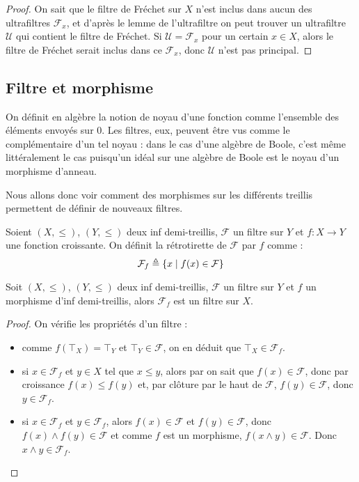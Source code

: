 \begin{proof}
  On sait que le filtre de Fréchet sur $X$ n'est inclus dans aucun des
  ultrafiltres $\mathcal F_x$, et d'après le lemme de l'ultrafiltre on peut
  trouver un ultrafiltre $\mathcal U$ qui contient le filtre de Fréchet. Si
  $\mathcal U = \mathcal F_x$ pour un certain $x\in X$, alors le filtre de
  Fréchet serait inclus dans ce $\mathcal F_x$, donc $\mathcal U$ n'est pas
  principal.
\end{proof}

\subsection{Filtre et morphisme}

On définit en algèbre la notion de noyau d'une fonction comme l'ensemble des
éléments envoyés sur $0$. Les filtres, eux, peuvent être vus comme le
complémentaire d'un tel noyau : dans le cas d'une algèbre de Boole, c'est même
littéralement le cas puisqu'un idéal sur une algèbre de Boole est le noyau d'un
morphisme d'anneau.

Nous allons donc voir comment des morphismes sur les différents treillis
permettent de définir de nouveaux filtres.

\begin{definition}
  Soient $(X,\leq)$, $(Y,\leq)$ deux inf demi-treillis, $\mathcal F$ un filtre
  sur $Y$ et $f : X \to Y$ une fonction croissante. On définit la rétrotirette
  de $\mathcal F$ par $f$ comme :
  \[\mathcal F_f \triangleq \{x\mid f(x) \in \mathcal F\}\]
\end{definition}

\begin{property}
  Soit $(X,\leq)$, $(Y,\leq)$ deux inf demi-treillis, $\mathcal F$ un filtre
  sur $Y$ et $f$ un morphisme d'inf demi-treillis, alors $\mathcal F_f$ est un
  filtre sur $X$.
\end{property}

\begin{proof}
  On vérifie les propriétés d'un filtre :
  \begin{itemize}
  \item comme $f(\top_X) = \top_Y$ et $\top_Y \in \mathcal F$, on en déduit que
    $\top_X\in\mathcal F_f$.
  \item si $x\in \mathcal F_f$ et $y\in X$ tel que $x\leq y$, alors par
    on sait que $f(x)\in\mathcal F$, donc par croissance $f(x)\leq f(y)$ et,
    par clôture par le haut de $\mathcal F$, $f(y)\in \mathcal F$, donc
    $y\in \mathcal F_f$.
  \item si $x\in \mathcal F_f$ et $y\in\mathcal F_f$, alors $f(x)\in\mathcal F$
    et $f(y)\in\mathcal F$, donc $f(x)\land f(y)\in\mathcal F$ et comme
    $f$ est un morphisme, $f(x\land y)\in\mathcal F$. Donc
    $x\land y\in\mathcal F_f$.
  \end{itemize}
\end{proof}

